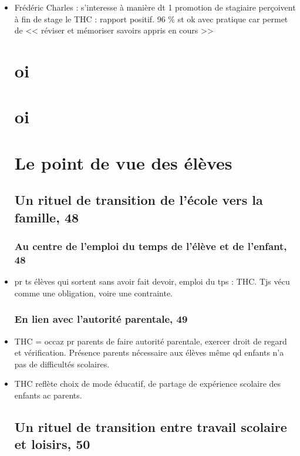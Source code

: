 \documentclass[12pt]{article}
\begin{document}
\begin{itemize}[label=]
\item Frédéric Charles : s'interesse à manière dt 1 promotion de stagiaire perçoivent à fin de stage le THC : rapport positif. 96 \% st ok avec pratique car permet de << réviser et mémoriser savoirs appris en cours >>

\newpage
\section{oi}
\section{oi}

\newpage

\section{Le point de vue des élèves}
\subsection{Un rituel de transition de l'école vers la famille, 48}
\subsubsection{Au centre de l'emploi du temps de l'élève et de l'enfant, 48}

\item pr ts élèves qui sortent sans avoir fait devoir, emploi du tps : THC. Tjs vécu comme une obligation, voire une contrainte.

\subsubsection{En lien avec l'autorité parentale, 49}

\item THC = occaz pr parents de faire autorité parentale, exercer droit de regard et vérification. Présence parents nécessaire aux élèves même qd enfants n'a pas  de difficultés scolaires. \\

\item THC reflète choix de mode éducatif, de partage de expérience scolaire des enfants ac parents.

\subsection{Un rituel de transition entre travail scolaire et loisirs, 50}


\end{itemize}
\end{document}
